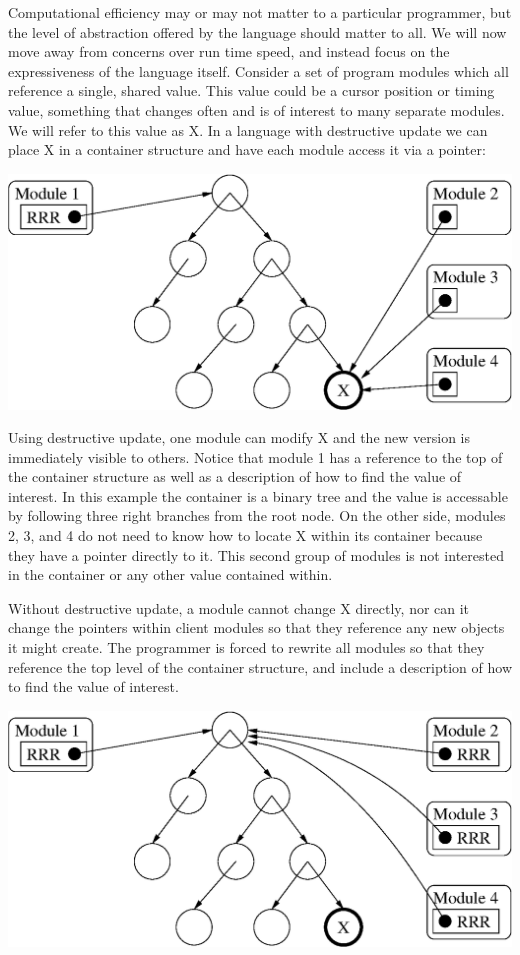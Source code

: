 Computational efficiency may or may not matter to a particular programmer, but the level of abstraction offered by the language should matter to all. We will now move away from concerns over run time speed, and instead focus on the expressiveness of the language itself. Consider a set of program modules which all reference a single, shared value. This value could be a cursor position or timing value, something that changes often and is of interest to many separate modules. We will refer to this value as X. In a language with destructive update we can place X in a container structure and have each module access it via a pointer:

\begin{center}
\includegraphics[scale=0.6]{1-Introduction/fig/destructive/broadcast-direct}
\end{center}

Using destructive update, one module can modify X and the new version is immediately visible to others. Notice that module 1 has a reference to the top of the container structure as well as a description of how to find the value of interest. In this example the container is a binary tree and the value is accessable by following three right branches from the root node. On the other side, modules 2, 3, and 4 do not need to know how to locate X within its container because they have a pointer directly to it. This second group of modules is not interested in the container or any other value contained within.

Without destructive update, a module cannot change X directly, nor can it change the pointers within client modules so that they reference any new objects it might create. The programmer is forced to rewrite all modules so that they reference the top level of the container structure, and include a description of how to find the value of interest.

\begin{center}
\includegraphics[scale=0.6]{1-Introduction/fig/destructive/broadcast-toplevel}
\end{center}

